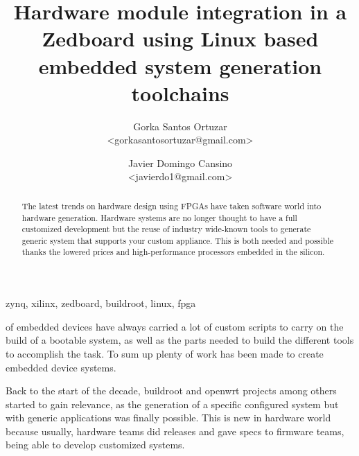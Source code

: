 \documentclass[a4paper,conference]{IEEEtran}
\begin{document}
\title{Hardware module integration in a Zedboard using Linux based embedded system generation toolchains}
\author{Gorka Santos Ortuzar\\<gorkasantosortuzar@gmail.com> \and Javier Domingo Cansino\\<javierdo1@gmail.com>}
\maketitle

\begin{abstract}
The latest trends on hardware design using FPGAs have taken software world into hardware generation.
Hardware systems are no longer thought to have a full customized development but the reuse of 
industry wide-known tools to generate generic system that supports your custom appliance.
This is both needed and possible thanks the lowered prices and high-performance processors embedded in the silicon.
\end{abstract}
\begin{IEEEkeywords}
zynq, xilinx, zedboard, buildroot, linux, fpga
\end{IEEEkeywords}

 of embedded devices have always carried a lot of custom scripts to carry on the build
of a bootable system, as well as the parts needed to build the different tools to accomplish the task. To sum up
plenty of work has been made to create embedded device systems.

Back to the start of the decade, buildroot and openwrt projects among others started to gain relevance, as the
generation of a specific configured system but with generic applications was finally possible. This is new in hardware
world because usually, hardware teams did releases and gave specs to firmware teams, being able to develop customized
systems.
\end{document}
